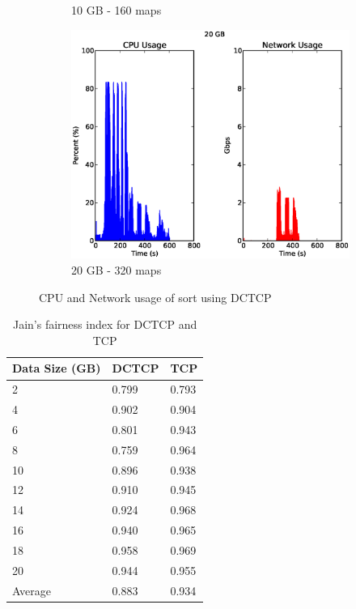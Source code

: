 \documentclass[a4paper,12pt,twoside,openright]{report}
\begin{document}
\begin{figure}[h!]
\begin{subfigure}[b]{0.33\textwidth}
                \caption{10 GB - 160 maps}
                \label{fig:10GBsortresdctcp}
        \end{subfigure}
        \begin{subfigure}[b]{0.33\textwidth}
                \centering
                \includegraphics[width=\textwidth]{320maps_dctcp.csv.eps}
                \caption{20 GB - 320 maps}
                \label{fig:20GBsortresdctcp}
        \end{subfigure}
        \caption{CPU and Network usage of sort using DCTCP}
        \label{chap:eval:sec:ciel:fig:sortresdctcp}
\end{figure}

\begin{table}
                \centering
  \begin{tabular}{| l || l | l |}
    \hline
	\textbf{Data Size (GB)} & \textbf{DCTCP} & \textbf{TCP} \\ \hline
    2 & 0.799 & 0.793 \\ \hline
    4 & 0.902 & 0.904 \\ \hline
    6 & 0.801 & 0.943 \\ \hline
    8 & 0.759 & 0.964 \\ \hline
    10 & 0.896 & 0.938 \\ \hline
    12 & 0.910 & 0.945 \\ \hline
    14 & 0.924 & 0.968 \\ \hline
    16 & 0.940 & 0.965 \\ \hline
    18 & 0.958 & 0.969 \\ \hline
    20 & 0.944 & 0.955 \\ \hline \hline
    Average & 0.883 & 0.934 \\
    \hline
  \end{tabular}
  \caption{Jain's fairness index for DCTCP and TCP}
  \label{chap:eval:sec:ciel:tab:jain}
\end{table}
\end{document}
